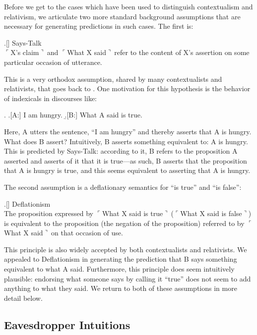 \documentclass[11pt]{article}
\newcommand{\ul}{$\ulcorner$}
\newcommand{\ur}{$\urcorner\ $}
\newcommand{\urn}{$\urcorner$}
\begin{document}
\begin{doublespace}

Before we get to the cases which have been used to distinguish contextualism and relativism, we articulate two more standard background assumptions that are necessary for generating predictions in such cases. The first is:

\ex.[] {\sc Says-Talk}\\
	{\ul X's claim\ur and \ul What X said\ur refer to the content of X's assertion on some particular occasion of utterance.}

This is a very orthodox assumption, shared by many contextualists and relativists, that goes back to \cite{kaplan:1989}. One motivation for this hypothesis is the behavior of indexicals in discourses like:

\ex. \a.[A:] I am hungry.
	\b.[B:] What A said is true.

Here, A utters the sentence, ``I am hungry'' and thereby asserts that A is hungry. What does B assert? Intuitively, B asserts something equivalent to: A is hungry. This is predicted by {\sc Says-Talk}: according to it, B refers to the proposition A asserted and asserts of it that it is true---as such, B asserts that the proposition that A is hungry is true, and this seems equivalent to asserting that A is hungry. 

The second assumption is a deflationary semantics for ``is true'' and ``is false'':

\ex.[] {\sc Deflationism} \\
	{The proposition expressed by \ul What X said is true\ur (\ul What X said is false\urn) is equivalent to the proposition (the negation of the proposition) referred to by \ul What X said\ur on that occasion of use.}
	
This principle is also widely accepted by both contextualists and relativists. We appealed to {\sc Deflationism} in generating the prediction that B says something equivalent to what A said. Furthermore, this principle does seem intuitively plausible: endorsing what someone says by calling it ``true'' does not seem to add anything to what they said. We return to both of these assumptions in more detail below.
	
\subsection{Eavesdropper Intuitions}
\label{1.1}


\end{doublespace}
\end{document}

